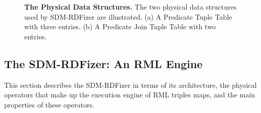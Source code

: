 \begin{figure}[h!]
 \centering

    \caption[Physical Data Structures for KGC]{{\bf The Physical Data Structures.} The two physical data structures used by SDM-RDFizer are illustrated. (a) A Predicate Tuple Table with three entries. (b) A Predicate Join Tuple Table with two entries.}
    \label{fig:hash_table}
\end{figure}
\subsection{The SDM-RDFizer: An RML Engine}

This section describes the SDM-RDFizer in terms of its architecture, the physical operators that make up the execution engine of RML triples maps, and the main properties of these operators.  

